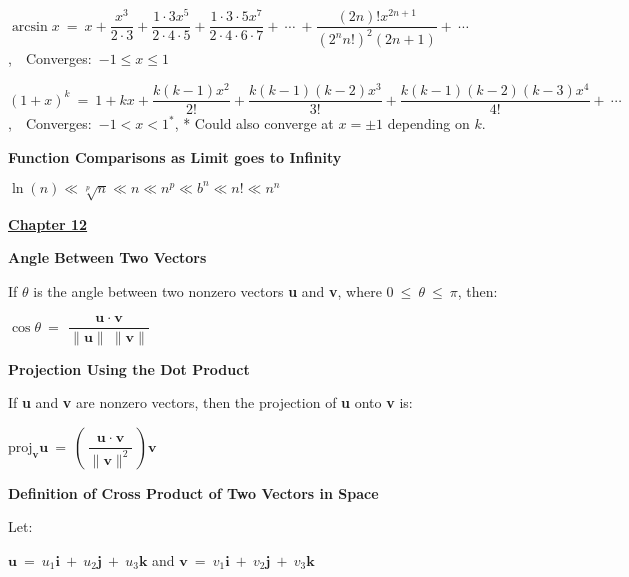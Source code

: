 \documentclass{article}
\begin{document}
\begin{large}
\begin{large}
$\arcsin x\ =\ x+\dfrac{x^{3}}{2\cdot 3}+\dfrac{1\cdot 3x^{5}}{2\cdot 4\cdot 5}+\dfrac{1\cdot 3\cdot 5x^{7}}{2\cdot 4\cdot 6\cdot 7}+\ \cdots\ +\dfrac{(2n)!x^{2n+1}}{(2^{n}n!)^{2}(2n+1)}+\ \cdots$,\ \ Converges:\ $-1\leq x\leq 1$

$(1+x)^{k}\ =\ 1+kx+\dfrac{k(k-1)x^{2}}{2!}+\dfrac{k(k-1)(k-2)x^{3}}{3!}+\dfrac{k(k-1)(k-2)(k-3)x^{4}}{4!}+\ \cdots$,\ \ Converges:\ $-1<x<1^{*}$, \hspace{1.5in} * Could also converge at $x=\pm 1$ depending on $k$.

\vspace{0.1in}
\textbf{Function Comparisons as Limit goes to Infinity}

\hspace{0.5in}$\ln(n) \ll \sqrt[p]{n} \ll n \ll n^p \ll b^n \ll n! \ll n^n$

\end{large}

\vspace{2.5in}

\underline{\textbf{\huge Chapter 12 \phantom{ } \phantom{ } \phantom{ } \phantom{ }}}

\textbf{Angle Between Two Vectors}

\hspace{0.1in} If $\theta$ is the angle between two nonzero vectors \textbf{u} and \textbf{v}, where $0\ \leq\ \theta\ \leq\ \pi$, then:

\hspace{2.5in} $\cos \theta\ =\ \dfrac{\textbf{u}\ \cdot\ \textbf{v}}{\|\textbf{u}\|\ \|\textbf{v}\|}$

\textbf{Projection Using the Dot Product}

\hspace{0.1in} If \textbf{u} and \textbf{v} are nonzero vectors, then the projection of \textbf{u} onto \textbf{v} is:

\hspace{2.0in} $\text{proj}_{\textbf{v}}\textbf{u}\ =\ \left(\dfrac{\textbf{u}\ \cdot\ \textbf{v}}{\|\textbf{v}\|^{2}}\right)\textbf{v}$

\textbf{Definition of Cross Product of Two Vectors in Space}

\hspace{0.1in} Let:

\hspace{0.2in} $\textbf{u}\ =\ u_{1}\textbf{i}\ +\ u_{2}\textbf{j}\ +\ u_{3}\textbf{k}$ and $\textbf{v}\ =\ v_{1}\textbf{i}\ +\ v_{2}\textbf{j}\ +\ v_{3}\textbf{k}$


\end{large}
\end{document}
